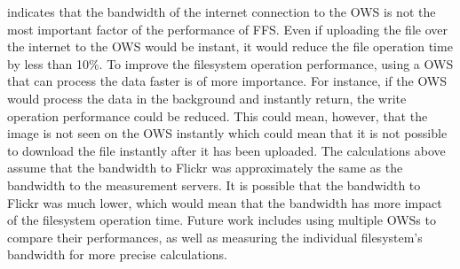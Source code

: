 indicates that the bandwidth of the internet connection to the \gls{OWS} is not the most important factor of the performance of \gls{FFS}. Even if uploading the file over the internet to the \gls{OWS} would be instant, it would reduce the file operation time by less than 10\%. To improve the filesystem operation performance, using a \gls{OWS} that can process the data faster is of more importance. For instance, if the \gls{OWS} would process the data in the background and instantly return, the write operation performance could be reduced. This could mean, however, that the image is not seen on the \gls{OWS} instantly which could mean that it is not possible to download the file instantly after it has been uploaded. The calculations above assume that the bandwidth to Flickr was approximately the same as the bandwidth to the measurement servers. It is possible that the bandwidth to Flickr was much lower, which would mean that the bandwidth has more impact of the filesystem operation time. Future work includes using multiple \gls{OWS}s to compare their performances, as well as measuring the individual filesystem's bandwidth for more precise calculations.


